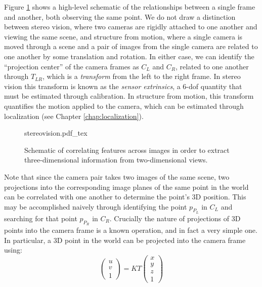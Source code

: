 Figure \ref{fig:stereovision} shows a high-level schematic of the relationships between a single frame and another, both observing the same point. We do not draw a distinction between stereo vision, where two cameras are rigidly attached to one another and viewing the same scene, and structure from motion, where a single camera is moved through a scene and a pair of images from the single camera are related to one another by some translation and rotation. In either case, we can identify the ``projection center'' of the camera frames as $C_L$ and $C_R$, related to one another through $T_{LR}$, which is a \emph{transform} from the left to the right frame. In stereo vision this transform is known as the \emph{sensor extrinsics}, a 6-dof quantity that must be estimated through calibration. In structure from motion, this transform quantifies the motion applied to the camera, which can be estimated through localization (see Chapter \ref{chap:localization}).

\begin{figure}
\centering
    \def\svgwidth{1.0\textwidth} 
    {stereovision.pdf_tex}
\caption{Schematic of correlating features across images in order to extract three-dimensional information from two-dimensional views.}
\label{fig:stereovision}
\end{figure}

Note that since the camera pair takes two images of the same scene, two projections into the corresponding image planes of the same point in the world can be correlated with one another to determine the point's 3D position. This may be accomplished naively through identifying the point $p_{P_L}$ in $C_L$ and searching for that point $p_{P_R}$ in $C_R$. Crucially the nature of projections of 3D points into the camera frame is a known operation, and in fact a very simple one. In particular, a 3D point in the world can be projected into the camera frame using:
\begin{equation}
\begin{pmatrix}
u\\
v\\
1
\end{pmatrix}
= K T \begin{pmatrix}
x\\
y\\
z\\
1 
\end{pmatrix}
\label{eq:stereovision}
\end{equation}

